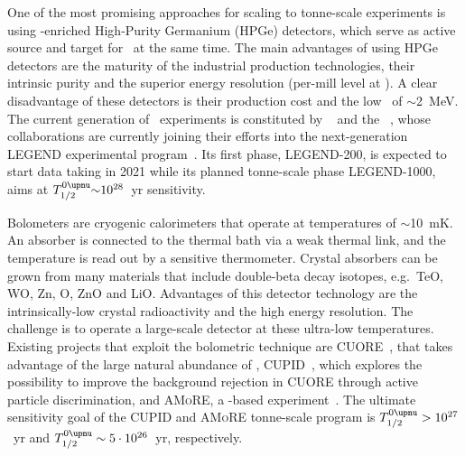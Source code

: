 \begin{description}[wide]

  \item[Semiconductors] One of the most promising approaches for scaling to tonne-scale
    experiments is using \gesix-enriched High-Purity Germanium (HPGe) detectors, which
    serve as active source and target for \onbb\ at the same time. The main advantages of
    using HPGe detectors are the maturity of the industrial production technologies, their
    intrinsic purity and the superior energy resolution (per-mill level at \qbb).  A clear
    disadvantage of these detectors is their production cost and the low \qbb\ of
    $\sim$2~MeV. The current generation of \gesix\ experiments is constituted by
    \gerda~\cite{Budjas2013} and the \majoranademo~\cite{Abgrall2014}, whose collaborations
    are currently joining their efforts into the next-generation LEGEND experimental
    program~\cite{Abgrall2017}. Its first phase, LEGEND-200, is expected to start data
    taking in 2021 while its planned tonne-scale phase LEGEND-1000, aims at $\thalfzeroM
    {\sim}10^{28}$~yr sensitivity.

  \item[Bolometers] Bolometers are cryogenic calorimeters that operate at temperatures of
    $\sim$10~mK. An absorber is connected to the thermal bath via a weak thermal link, and
    the temperature is read out by a sensitive thermometer. Crystal absorbers can be grown
    from many materials that include double-beta decay isotopes, e.g.~TeO,
    WO, Zn, O,
    ZnO and  LiO.  Advantages
    of this detector technology are the intrinsically-low crystal radioactivity and the
    high energy resolution. The challenge is to operate a large-scale detector at these
    ultra-low temperatures. Existing projects that exploit the bolometric technique are
    CUORE~\cite{Arnaboldi2002, Artusa2014}, that takes advantage of the large natural
    abundance of , CUPID~\cite{Wang2015}, which explores the possibility to
    improve the background rejection in CUORE through active particle discrimination, and
    \textsc{AMoRE}, a -based experiment~\cite{Kim2015}. The ultimate
    sensitivity goal of the CUPID and \textsc{AMoRE} tonne-scale program is $\thalfzeroM >
    10^{27}$~yr and $\thalfzeroM \sim 5 \cdot 10^{26}$~yr, respectively.


\end{description}
